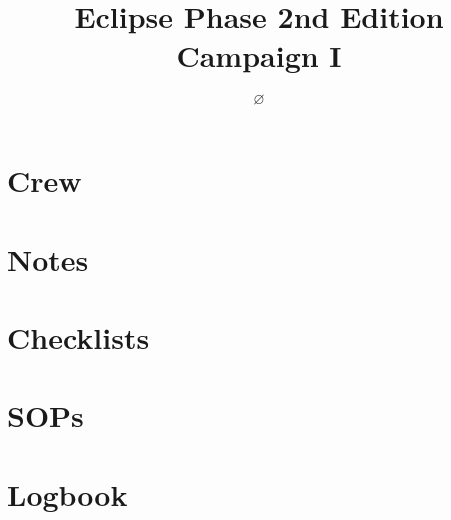 \documentclass[a4paper, twoside, ngerman]{book}%
\title{Eclipse Phase 2nd Edition \\ Campaign I}
\author{$\varnothing$}
\begin{document}






\maketitle

\tableofcontents

\setlength{\parskip}{1ex}




\chapter{Crew}




\chapter{Notes \texttt{\egr{}}}


\chapter{Checklists}


\chapter{SOPs}


\chapter{Logbook}


\printglossary[nonumberlist=false, style=altlist]

\printbibliography

{\footnotesize
    \printindex
}
\end{document}
